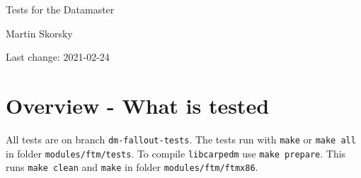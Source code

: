 \documentclass[12pt,a4paper]{report}
\begin{document}
\begin{titlepage}
\vspace{2cm}
\begin{center}
\Huge{Tests for the Datamaster}

\Large{Martin Skorsky}

\Large{Last change: 2021-02-24}
\end{center}
\vfill
\end{titlepage}

\tableofcontents

\chapter{Overview - What is tested}
All tests are on branch \texttt{dm-fallout-tests}. The tests run with \texttt{make} or \texttt{make all} in folder \texttt{modules/ftm/tests}.
To compile \texttt{libcarpedm} use \texttt{make prepare}. This runs \texttt{make clean} and \texttt{make} in folder \texttt{modules/ftm/ftmx86}.
\end{document}
